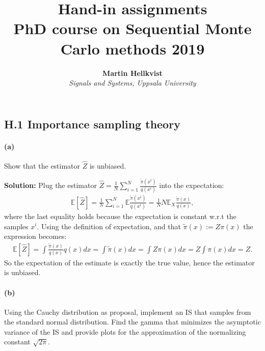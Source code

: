 \documentclass{article}
\title{Hand-in assignments \\ PhD course on Sequential Monte Carlo methods 2019}
\author{\textbf{Martin Hellkvist}\\
	 \textit{Signals and Systems, Uppsala University}}
\begin{document}
\maketitle
\subsection*{H.1 Importance sampling theory}
\paragraph{(a)} Show that the estimator $\hat{Z}$ is unbiased.

\textbf{Solution:} Plug the estimator $\hat{Z}=\frac{1}{N}\sum_{i=1}^N \frac{\tilde{\pi}(x^i)}{q(x^i)}$ into the expectation:
\begin{align}
	\mathbb{E}[\hat{Z}] = \frac{1}{N}\sum_{i=1}^{N}\mathbb{E}\frac{\tilde{\pi}(x^i)}{q(x^i)} = \frac{1}{N}N\mathbb{E}_X\frac{\tilde{\pi}(x)}{q(x)}, 
\end{align}
where the last equality holds because the expectation is constant w.r.t the samples $x^i$. Using the definition of expectation, and that $\tilde{\pi}(x):= Z\pi(x)$ the expression becomes:
\begin{align}
	\mathbb{E}[\hat{Z}]= \int \frac{\tilde{\pi}(x)}{q(x)}q(x)dx = \int \tilde{\pi}(x)dx = \int Z \pi(x) dx= Z\int\pi(x)dx = Z.
\end{align}
So the expectation of the estimate is exactly the true value, hence the estimator is unbiased.

\paragraph{(b)}
Using the Cauchy distribution as proposal, implement an IS that samples from the standard normal distribution. Find the gamma that minimizes the asymptotic variance of the IS and provide plots for the approximation of the normalizing constant $\sqrt{2\pi}$.
\end{document}
